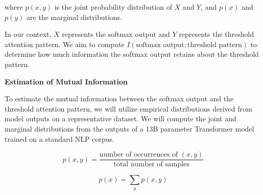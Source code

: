 \documentclass[11pt]{article}
\theoremstyle{definition}
\begin{document}
where \(p(x, y)\) is the joint probability distribution of \(X\) and \(Y\), and \(p(x)\) and \(p(y)\) are the marginal distributions.













In our context, \(X\) represents the softmax output and \(Y\) represents the threshold attention pattern. We aim to compute \(I(\text{softmax output}; \text{threshold pattern})\) to determine how much information the softmax output retains about the threshold pattern.













\textbf{Estimation of Mutual Information}













To estimate the mutual information between the softmax output and the threshold attention pattern, we will utilize empirical distributions derived from model outputs on a representative dataset. We will compute the joint and marginal distributions from the outputs of a 13B parameter Transformer model trained on a standard NLP corpus.













\begin{equation}






p(x, y) = \frac{\text{number of occurrences of } (x, y)}{\text{total number of samples}}






\end{equation}






\begin{equation}






p(x) = \sum_{y} p(x, y)






\end{equation}
\end{document}
